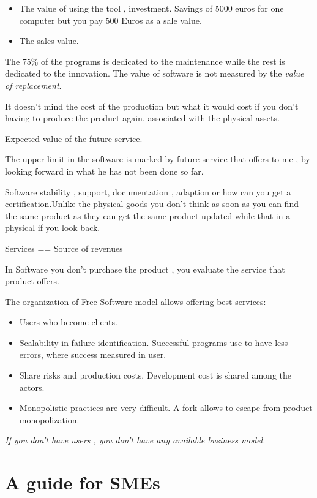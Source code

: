 \begin{itemize}
    \item The value of using the tool , investment.
    Savings of 5000 euros  for one computer but you pay 500 Euros as a sale
    value.
    \item The sales value.
\end{itemize}


The 75\% of the programs is dedicated to the maintenance while the rest is
dedicated to the innovation.
The value of software is not measured by the \emph{value of replacement}. 

It doesn't mind the cost of the production but what it would cost if you don't
having to produce the product again, associated with the physical assets.


Expected value of the future service.

The upper limit in the software is marked by future service that offers to me ,
by looking forward in what he has not been done so far.

Software stability , support, documentation , adaption or how can you get a
certification.Unlike the physical goods you don't think as soon as you can find
the same product as they can get the same product updated while that in a
physical if you look back.

    Services == Source of revenues

In Software you don't purchase the product , you evaluate the service that product offers.

The organization of Free Software model allows offering best services:
\begin{itemize}
    \item Users who become clients.
    \item Scalability in failure identification. Successful programs use to have less errors, where success measured in user.
    \item Share risks and production costs. Development cost is shared among the actors.
    \item Monopolistic practices are very difficult. A fork allows to escape from product monopolization.
\end{itemize}

\emph{If you don't have users , you don't have any available business model.}

\section{A guide for SMEs}

